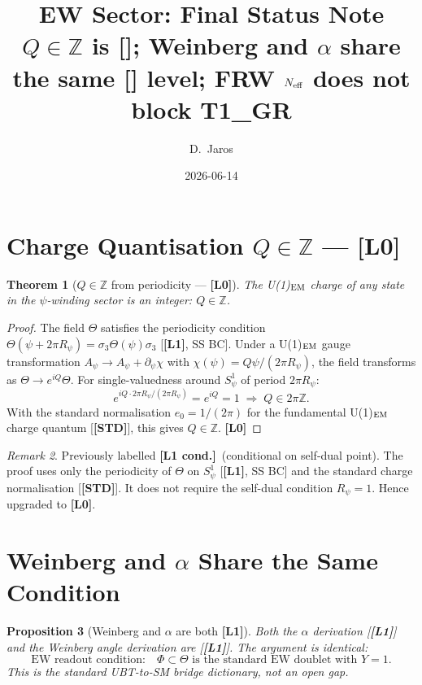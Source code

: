 \documentclass[12pt,a4paper]{article}
\title{\textbf{EW Sector: Final Status Note}\\[4pt]
\large $Q\in\mathbb{Z}$ is [\Lz]; Weinberg and $\alpha$ share the same
[\Lc] level; FRW $N_{\rm eff}$ does not block T1\_GR}
\author{D.~Jaros}
\date{2026-06-14}
\newtheorem{theorem}{Theorem}[section]
\newtheorem{proposition}[theorem]{Proposition}
\theoremstyle{remark}\newtheorem{remark}[theorem]{Remark}
\newcommand{\Lz}{\textbf{[L0]}}
\newcommand{\Lo}{\textbf{[L1]}}
\newcommand{\Lc}{\textbf{[L1 cond.]}}
\newcommand{\STD}{\textbf{[STD]}}
\begin{document}
\maketitle
\fi

\section{Charge Quantisation $Q\in\mathbb{Z}$ — \Lz}
\label{sec:charge}

\begin{theorem}[$Q\in\mathbb{Z}$ from periodicity — \Lz]
\label{thm:charge}
The U(1)$_{\rm EM}$ charge of any state in the $\psi$-winding sector
is an integer: $Q\in\mathbb{Z}$.
\end{theorem}

\begin{proof}
The field $\Theta$ satisfies the periodicity condition
$\Theta(\psi+2\pi R_\psi) = \sigma_3\Theta(\psi)\sigma_3$ [\Lo, SS BC].
Under a U(1)$_{\rm EM}$ gauge transformation $A_\psi\to A_\psi+\partial_\psi\chi$
with $\chi(\psi)=Q\psi/(2\pi R_\psi)$, the field transforms as
$\Theta\to e^{iQ}\Theta$.
For single-valuedness around $S^1_\psi$ of period $2\pi R_\psi$:
\[
  e^{iQ\cdot2\pi R_\psi/(2\pi R_\psi)} = e^{iQ} = 1
  \;\Longrightarrow\; Q\in 2\pi\mathbb{Z}.
\]
With the standard normalisation $e_0=1/(2\pi)$ for the fundamental
U(1)$_{\rm EM}$ charge quantum [\STD], this gives $Q\in\mathbb{Z}$. \Lz
\end{proof}

\begin{remark}
Previously labelled \Lc\ (conditional on self-dual point).
The proof uses only the periodicity of $\Theta$ on $S^1_\psi$ [\Lo,
SS BC] and the standard charge normalisation [\STD]. It does not
require the self-dual condition $R_\psi=1$. Hence upgraded to \Lz.
\end{remark}

\section{Weinberg and $\alpha$ Share the Same Condition}
\label{sec:shared}

\begin{proposition}[Weinberg and $\alpha$ are both \Lo]
\label{prop:shared}
Both the $\alpha$ derivation [\Lo] and the Weinberg angle derivation
are [\Lo]. The argument is identical:
\[
  \text{EW readout condition:}\quad
  \Phi\subset\Theta \text{ is the standard EW doublet with } Y=1.
\]
This is the standard UBT-to-SM bridge dictionary, not an open gap.
\end{proposition}
\end{document}
